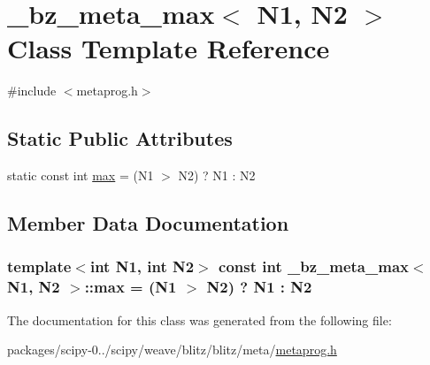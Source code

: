 \hypertarget{class__bz__meta__max}{}\section{\+\_\+bz\+\_\+meta\+\_\+max$<$ N1, N2 $>$ Class Template Reference}
\label{class__bz__meta__max}


{\ttfamily \#include $<$metaprog.\+h$>$}

\subsection*{Static Public Attributes}
\begin{DoxyCompactItemize}
\item 
static const int \hyperlink{class__bz__meta__max_abbeecc7f4350063c05821f5af6cd68d2}{max} = (N1 $>$ N2) ? N1 \+: N2
\end{DoxyCompactItemize}


\subsection{Member Data Documentation}
\hypertarget{class__bz__meta__max_abbeecc7f4350063c05821f5af6cd68d2}{}
\subsubsection[{max}]{\setlength{\rightskip}{0pt plus 5cm}template$<$int N1, int N2$>$ const int {\bf \+\_\+bz\+\_\+meta\+\_\+max}$<$ N1, N2 $>$\+::max = (N1 $>$ N2) ? N1 \+: N2\hspace{0.3cm}{\ttfamily [static]}}\label{class__bz__meta__max_abbeecc7f4350063c05821f5af6cd68d2}


The documentation for this class was generated from the following file\+:\begin{DoxyCompactItemize}
\item 
packages/scipy-\/0../scipy/weave/blitz/blitz/meta/\hyperlink{metaprog_8h}{metaprog.\+h}\end{DoxyCompactItemize}
